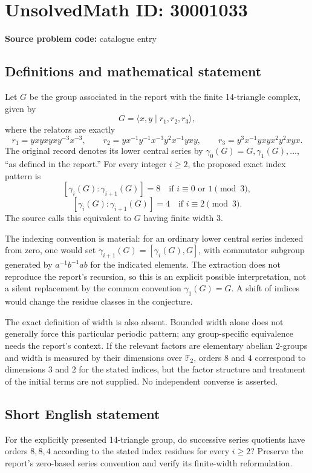\documentclass[11pt]{article}
\newcommand{\F}{\mathbb{F}}
\begin{document}
\section*{UnsolvedMath ID: 30001033}
\textbf{Source problem code:} catalogue entry
\subsection{Definitions and mathematical statement}
Let \(G\) be the group associated in the report with the finite 14-triangle complex, given by
\[
G=\langle x,y\mid r_1,r_2,r_3\rangle,
\]
where the relators are exactly
\[
r_1=yxyxyxy^{-3}x^{-3},
\qquad r_2=yx^{-1}y^{-1}x^{-3}y^2x^{-1}yxy,
\qquad r_3=y^3x^{-1}yxyx^2y^2xyx.
\]
The original record denotes its lower central series by \(\gamma_0(G)=G,\gamma_1(G),\ldots\), ``as defined in the report.'' For every integer \(i\geq2\), the proposed exact index pattern is
\[
[\gamma_i(G):\gamma_{i+1}(G)]=8
\quad\text{if }i\equiv0\text{ or }1\pmod3,
\]
\[
[\gamma_i(G):\gamma_{i+1}(G)]=4
\quad\text{if }i\equiv2\pmod3.
\]
The source calls this equivalent to \(G\) having finite width \(3\).

The indexing convention is material: for an ordinary lower central series indexed from zero, one would set \(\gamma_{i+1}(G)=[\gamma_i(G),G]\), with commutator subgroup generated by \(a^{-1}b^{-1}ab\) for the indicated elements. The extraction does not reproduce the report's recursion, so this is an explicit possible interpretation, not a silent replacement by the common convention \(\gamma_1(G)=G\). A shift of indices would change the residue classes in the conjecture.

The exact definition of width is also absent. Bounded width alone does not generally force this particular periodic pattern; any group-specific equivalence needs the report's context. If the relevant factors are elementary abelian \(2\)-groups and width is measured by their dimensions over \(\F_2\), orders \(8\) and \(4\) correspond to dimensions \(3\) and \(2\) for the stated indices, but the factor structure and treatment of the initial terms are not supplied. No independent converse is asserted.
\subsection{Short English statement}
For the explicitly presented 14-triangle group, do successive series quotients have orders \(8,8,4\) according to the stated index residues for every \(i\geq2\)? Preserve the report's zero-based series convention and verify its finite-width reformulation.
\end{document}
